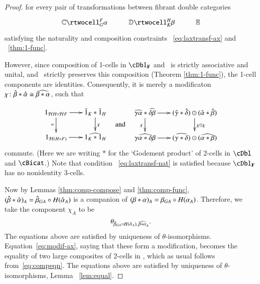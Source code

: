 \documentclass{amsart}
\begin{document}
\begin{proof}
for every pair of transformations between fibrant double categories
  \[\vcenter{\xymatrix{\lC \rtwocell^F_G{\al} & \lD \rtwocell^H_K{\be}
      & \lE}}\]
satisfying the naturality and composition constraints ~\ref{eq:laxtransf-ax} and ~\ref{thm:1-func}.

However, since composition of
  1-cells in $\cDbl_{\bf F}$ and \cBicat\ is strictly associative and
  unital, and \cH\ strictly preserves this composition (Theorem \ref{thm:1-func}),
  the 1-cell components are identities. Consequently, it is merely  a modificaton $\chi\colon \hat{\beta} * \hat{\alpha} \cong \widehat{\beta*\alpha}$, such that 
 
 \begin{equation}
        \vcenter{\xymatrix@-.5pc{
        1_{{\cH}H \circ {\cH}F} \ar[r]\ar[d]_{=} &
        \hat{1}_{K}*\hat{1}_{H}\ar[d]^{\chi}\\
        1_{{\cH}(H \circ F)}\ar[r] &
        \widehat{1_{K} *1_{H}}}} \quad\text{and}\quad       
    \vcenter{\xymatrix@-.5pc{
        \widehat{\gm\al}*\widehat{\de\be} \ar[r]\ar[d]_\chi &
        (\gmhat*\dehat)\odot(\alhat*\behat)\ar[d]^{\chi \odot \chi}\\
        \widehat{\gm\al*\de\be}\ar[r] &
        (\widehat{\gm*\de})\odot(\widehat{\al*\be})}}
  \end{equation}
commute. (Here we are writing $*$ for the `Godement product' of 2-cells in $\cDbl$ and $\cBicat$.)    
Note that condition ~\ref{eq:laxtransf-nat} is satisfied because $\cDbl_{\bf F}$ has no nonidentity 3-cells.
  
  Now by Lemmas \ref{thm:comp-compose} and
  \ref{thm:comp-func}, $(\hat{\beta} *\hat{\alpha})_A = \hat{\beta}_{GA} \circ
  H(\hat{\alpha}_A)$ is a companion of $(\beta*\alpha)_A = \beta_{GA} \circ
  H(\alpha_A)$.  Therefore, we take the component $\chi_A$ to be
  \[\theta_{\hat{\beta}_{GA} \circ H(\hat{\alpha}_A),\, \widehat{\beta*\alpha}_A}.\]
  The equations above are satisfied by uniqueness of $\theta$-isomorphisms.
   Equation~\eqref{eq:modif-ax}, saying that these form a modification,
  becomes the equality of two large composites of 2-cells in \lD,
  which as usual follows from~\eqref{eq:compeqn}. The equations above are satisfied by uniqueness of $\theta$-isomorphisms, Lemma ~\ref{lem:equal}.


\end{proof}
\end{document}
